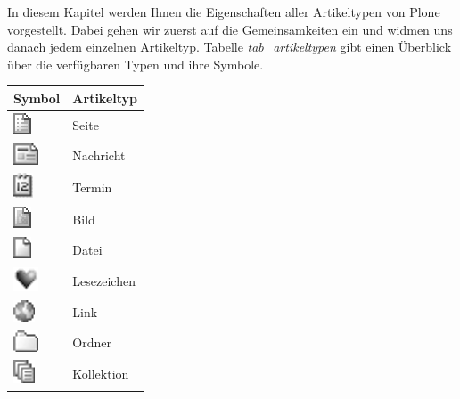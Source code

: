 \documentclass[a4paper,12pt,ngerman]{manual}
\begin{document}
In diesem Kapitel werden Ihnen die Eigenschaften aller Artikeltypen
von Plone vorgestellt. Dabei gehen wir zuerst auf die Gemeinsamkeiten
ein und widmen uns danach jedem einzelnen Artikeltyp.  Tabelle
\emph{tab\_artikeltypen} gibt einen Überblick über die verfügbaren
Typen und ihre Symbole.
\hypertarget{tab-artikeltypen}{}
\begin{tabulary}{\textwidth}{|L|L|}
\hline
\textbf{
Symbol
} & \textbf{
Artikeltyp
}\\
\hline

\includegraphics{typ-seite.png}
 & 
Seite
\\

\includegraphics{typ-nachricht.png}
 & 
Nachricht
\\

\includegraphics{typ-termin.png}
 & 
Termin
\\

\includegraphics{typ-bild.png}
 & 
Bild
\\

\includegraphics{typ-datei.png}
 & 
Datei
\\

\includegraphics{typ-lesezeichen.png}
 & 
Lesezeichen
\\

\includegraphics{typ-link.png}
 & 
Link
\\

\includegraphics{typ-ordner.png}
 & 
Ordner
\\

\includegraphics{typ-kollektion.png}
 & 
Kollektion
\\
\hline
\end{tabulary}
\end{document}
